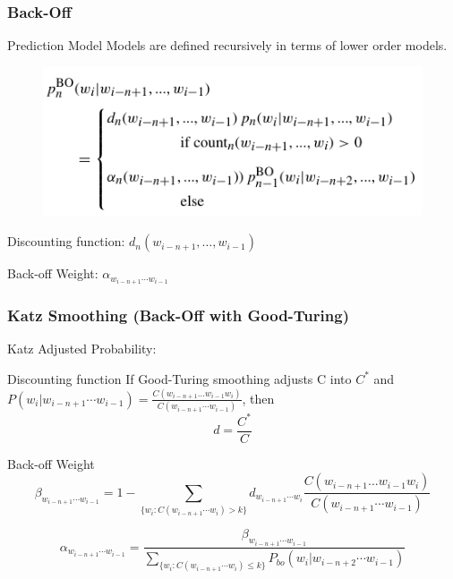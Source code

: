 \documentclass{beamer}
\begin{document}
\begin{frame}\frametitle{Back-Off}

\begin{block}{Prediction Model}
Models are defined recursively in terms of lower order models.
\begin{figure}
\includegraphics[width=0.7\linewidth]{figure/back_off.pdf}
\end{figure}

Discounting function: $d_n(w_{i-n+1}, \ldots, w_{i-1})$

Back-off Weight: $\alpha_{w_{i-n+1} \cdots w_{i -1}}$
\end{block}



\end{frame}


\begin{frame}\frametitle{Katz Smoothing (Back-Off with Good-Turing)}
Katz Adjusted Probability:
\begin{block}{Discounting function}
If Good-Turing smoothing adjusts C into $C^*$ and
$ P (w_i | w_{i-n+1} \cdots w_{i-1}) =
\frac{C(w_{i-n+1}...w_{i-1}w_{i})}{C(w_{i-n+1} \cdots w_{i-1})}$, 
then $$d = \frac{C^*}{C}$$
\end{block}


\begin{block}{Back-off Weight}
\vspace{-8pt}
$$
\beta_{w_{i-n+1} \cdots w_{i -1}} = 1 - \sum_{ \{w_i : C(w_{i-n+1}
  \cdots w_{i}) > k \} } d_{w_{i-n+1} \cdots w_{i}}
\frac{C(w_{i-n+1}...w_{i-1} w_{i})}{C(w_{i-n+1} \cdots w_{i-1})} 
$$

$$
\alpha_{w_{i-n+1} \cdots w_{i -1}} = \frac{\beta_{w_{i-n+1} \cdots
    w_{i -1}}}        {\sum_{ \{ w_i : C(w_{i-n+1} \cdots w_{i}) \leq
    k \} } P_{bo}(w_i | w_{i-n+2} \cdots w_{i-1})}
$$
\end{block}

\end{frame}
\end{document}
